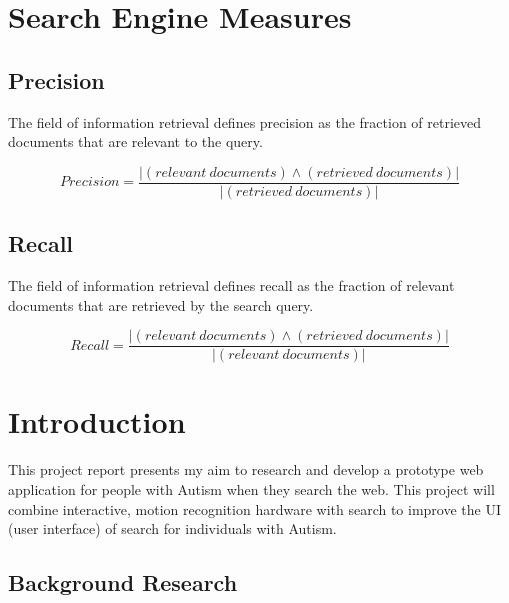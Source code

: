 \documentclass[a4paper, 11pt]{article}
\begin{document}
\section*{Search Engine Measures}
\newcommand{\cfplus}{\mathbin{\genfrac{}{}{0pt}{}{}{+}}}

\subsection*{Precision}
The field of information retrieval defines precision as the fraction of retrieved documents that are relevant to the query. 

\begin{equation*}
Precision
=\frac{|(relevant\ documents) \land (retrieved\ documents)|}{|(retrieved\ documents)|}
\end{equation*}

\subsection*{Recall}
The field of information retrieval defines recall as the fraction of relevant documents that are retrieved by the search query. 

\begin{equation*}
Recall
=\frac{|(relevant\ documents) \land (retrieved\ documents)|}{|(relevant\ documents)|}
\end{equation*}
\clearpage

\section{Introduction}\label{intro}

This project report presents my aim to research and develop a prototype web application for people with Autism when they search the web. This project will combine interactive, motion recognition hardware with search to improve the UI (user interface) of search for individuals with Autism. 

\subsection {Background Research}\label{background} 
\end{document}
